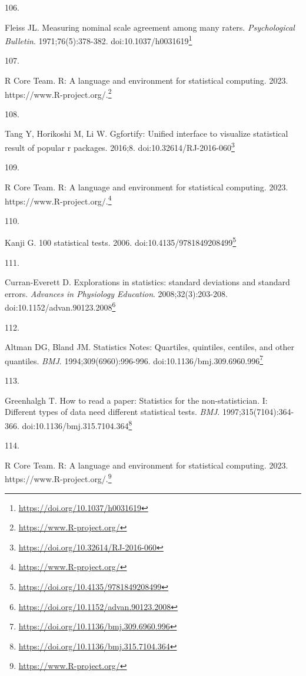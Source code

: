 \documentclass[
  a4paper,
]{book}
\newlength{\cslhangindent}
\newlength{\csllabelwidth}
\newlength{\cslentryspacingunit} %
\newenvironment{CSLReferences}[2] %
 {%
  \setlength{\parindent}{0pt}
  \ifodd #1
  \let\oldpar\par
  \def\par{\hangindent=\cslhangindent\oldpar}
  \fi
  \setlength{\parskip}{#2\cslentryspacingunit}
 }%
 {}
\newcommand{\CSLLeftMargin}[1]{\parbox[t]{\csllabelwidth}{#1}}
\newcommand{\CSLRightInline}[1]{\parbox[t]{\linewidth - \csllabelwidth}{#1}\break}
\renewcommand{\href}[2]{#2\footnote{\url{#1}}}
\begin{document}
\begin{CSLReferences}{0}{0}
\leavevmode{}%
\CSLLeftMargin{106. }%
\CSLRightInline{Fleiss JL. Measuring nominal scale agreement among many raters. \emph{Psychological Bulletin}. 1971;76(5):378-382. doi:\href{https://doi.org/10.1037/h0031619}{10.1037/h0031619}}

\leavevmode{}%
\CSLLeftMargin{107. }%
\CSLRightInline{R Core Team. R: A language and environment for statistical computing. 2023. \href{https://www.R-project.org/}{https://www.R-project.org/.}}

\leavevmode{}%
\CSLLeftMargin{108. }%
\CSLRightInline{Tang Y, Horikoshi M, Li W. Ggfortify: Unified interface to visualize statistical result of popular r packages. 2016;8. doi:\href{https://doi.org/10.32614/RJ-2016-060}{10.32614/RJ-2016-060}}

\leavevmode{}%
\CSLLeftMargin{109. }%
\CSLRightInline{R Core Team. R: A language and environment for statistical computing. 2023. \href{https://www.R-project.org/}{https://www.R-project.org/.}}

\leavevmode{}%
\CSLLeftMargin{110. }%
\CSLRightInline{Kanji G. 100 statistical tests. 2006. doi:\href{https://doi.org/10.4135/9781849208499}{10.4135/9781849208499}}

\leavevmode{}%
\CSLLeftMargin{111. }%
\CSLRightInline{Curran-Everett D. Explorations in statistics: standard deviations and standard errors. \emph{Advances in Physiology Education}. 2008;32(3):203-208. doi:\href{https://doi.org/10.1152/advan.90123.2008}{10.1152/advan.90123.2008}}

\leavevmode{}%
\CSLLeftMargin{112. }%
\CSLRightInline{Altman DG, Bland JM. Statistics Notes: Quartiles, quintiles, centiles, and other quantiles. \emph{BMJ}. 1994;309(6960):996-996. doi:\href{https://doi.org/10.1136/bmj.309.6960.996}{10.1136/bmj.309.6960.996}}

\leavevmode{}%
\CSLLeftMargin{113. }%
\CSLRightInline{Greenhalgh T. How to read a paper: Statistics for the non-statistician. I: Different types of data need different statistical tests. \emph{BMJ}. 1997;315(7104):364-366. doi:\href{https://doi.org/10.1136/bmj.315.7104.364}{10.1136/bmj.315.7104.364}}

\leavevmode{}%
\CSLLeftMargin{114. }%
\CSLRightInline{R Core Team. R: A language and environment for statistical computing. 2023. \href{https://www.R-project.org/}{https://www.R-project.org/.}}


\end{CSLReferences}
\end{document}
